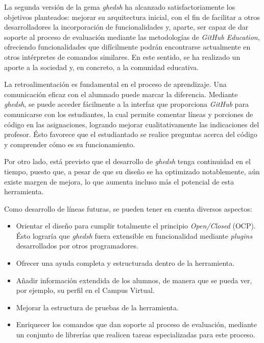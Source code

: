 

La segunda versión de la gema {\it ghedsh} ha alcanzado satisfactoriamente los objetivos planteados: mejorar su arquitectura inicial, con el fin de facilitar a otros desarrolladores
la incorporación de funcionalidades y, aparte, ser capaz de dar soporte al proceso de evaluación mediante las metodologías de {\it GitHub Education}, ofreciendo funcionalidades que difícilmente
podrán encontrarse actualmente en otros intérpretes de comandos similares. En este sentido, se ha realizado un aporte a la sociedad y, en concreto, a la comunidad educativa.
\bigskip

La retroalimentación es fundamental en el proceso de aprendizaje. Una comunicación eficaz con el alumnado puede marcar la diferencia. Mediante {\it ghedsh}, se puede acceder fácilmente a la interfaz que proporciona {\it GitHub} para comunicarse con los estudiantes, la cual permite comentar líneas y porciones de código en las asignaciones, logrando
mejorar cualitativamente las indicaciones del profesor. Ésto favorece que el estudiantado se realice preguntas acerca del código y comprender cómo es su funcionamiento.
\bigskip

Por otro lado, está previsto que el desarrollo de {\it ghedsh} tenga continuidad en el tiempo, puesto que, a pesar de que su diseño se ha optimizado notablemente, aún existe margen de mejora, lo que aumenta incluso más el potencial de esta herramienta.
\bigskip

Como desarrollo de líneas futuras, se pueden tener en cuenta diversos aspectos:
\begin{itemize}
	\item Orientar el diseño para cumplir totalmente el principio {\it Open/Closed} (OCP). Ésto lograría que {\it ghedsh} fuera extensible en funcionalidad mediante {\it plugins} desarrollados por otros programadores.
	\item Ofrecer una ayuda completa y estructurada dentro de la herramienta.
	\item Añadir información extendida de los alumnos, de manera que se pueda ver, por ejemplo, su perfil en el Campus Virtual.
	\item Mejorar la estructura de pruebas de la herramienta.
	\item Enriquecer los comandos que dan soporte al proceso de evaluación, mediante un conjunto de librerías que realicen tareas especializadas para este proceso.
\end{itemize}